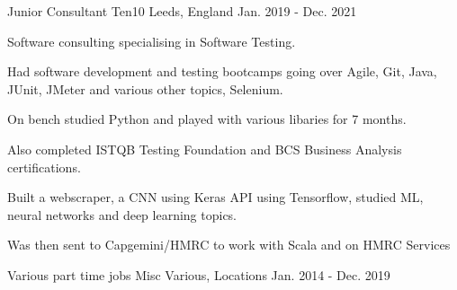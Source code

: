 \begin{cventries}
{    }
    \cventry
    {Junior Consultant} 
    {Ten10} 
    {Leeds, England} 
    {Jan. 2019 - Dec. 2021}
    {
      \raggedright
      \begin{cvitems}
        \item {Software consulting specialising in Software Testing.}
        \item {Had software development and testing bootcamps going over Agile, Git, Java, JUnit, JMeter and various other topics, Selenium.}
        \item {On bench studied Python and played with various libaries for 7 months.}
        \item {Also completed ISTQB Testing Foundation and BCS Business Analysis certifications.}
        \item {Built a webscraper, a CNN using Keras API using Tensorflow, studied ML, neural networks and deep learning topics.}
        \item {Was then sent to Capgemini/HMRC to work with Scala and on HMRC Services}
      \end{cvitems}
    }    

\cventry
    {Various part time jobs} 
    {Misc} 
    {Various, Locations} 
    {Jan. 2014 - Dec. 2019}
    {}      

\end{cventries}
